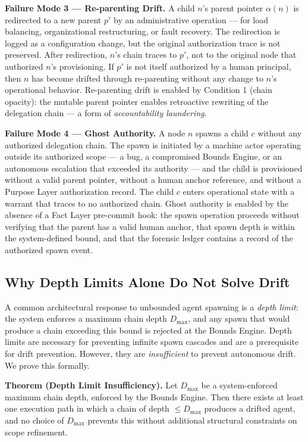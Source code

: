\medskip
\noindent\textbf{Failure Mode 3 — Re-parenting Drift.}
A child $n$'s parent pointer $\alpha(n)$ is redirected to a new parent $p'$ by an administrative operation — for load balancing, organizational restructuring, or fault recovery. The redirection is logged as a configuration change, but the original authorization trace is not preserved. After redirection, $n$'s chain traces to $p'$, not to the original node that authorized $n$'s provisioning. If $p'$ is not itself authorized by a human principal, then $n$ has become drifted through re-parenting without any change to $n$'s operational behavior. Re-parenting drift is enabled by Condition 1 (chain opacity): the mutable parent pointer enables retroactive rewriting of the delegation chain — a form of \emph{accountability laundering}.

\medskip
\noindent\textbf{Failure Mode 4 — Ghost Authority.}
A node $n$ spawns a child $c$ without any authorized delegation chain. The spawn is initiated by a machine actor operating outside its authorized scope — a bug, a compromised Bounds Engine, or an autonomous escalation that exceeded its authority — and the child is provisioned without a valid parent pointer, without a human anchor reference, and without a Purpose Layer authorization record. The child $c$ enters operational state with a warrant that traces to no authorized chain. Ghost authority is enabled by the absence of a Fact Layer pre-commit hook: the spawn operation proceeds without verifying that the parent has a valid human anchor, that spawn depth is within the system-defined bound, and that the forensic ledger contains a record of the authorized spawn event.

\subsection{Why Depth Limits Alone Do Not Solve Drift}
\label{sec:rs-drift-depth-limits}

A common architectural response to unbounded agent spawning is a \emph{depth limit}: the system enforces a maximum chain depth $D_{\max}$, and any spawn that would produce a chain exceeding this bound is rejected at the Bounds Engine. Depth limits are necessary for preventing infinite spawn cascades and are a prerequisite for drift prevention. However, they are \emph{insufficient} to prevent autonomous drift. We prove this formally.

\medskip
\noindent\textbf{Theorem (Depth Limit Insufficiency).}
Let $D_{\max}$ be a system-enforced maximum chain depth, enforced by the Bounds Engine. Then there exists at least one execution path in which a chain of depth $\leq D_{\max}$ produces a drifted agent, and no choice of $D_{\max}$ prevents this without additional structural constraints on scope refinement.

